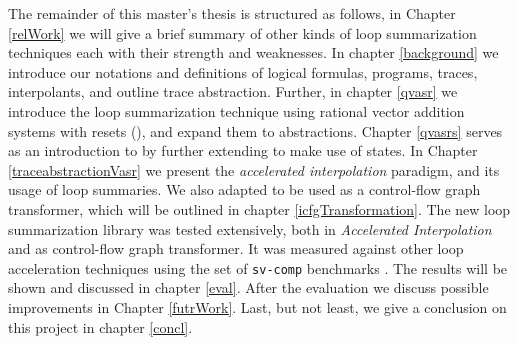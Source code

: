 The remainder of this master's thesis is structured as follows, in Chapter \ref{relWork} we will give a brief summary of other kinds of loop summarization techniques each with their strength and weaknesses. In chapter \ref{background} we introduce our notations and definitions of logical formulas, programs, traces, interpolants, and outline trace abstraction. Further, in chapter \ref{qvasr} we introduce the loop summarization technique using rational vector addition systems with resets (\qvasr), and expand them to \qvasr abstractions. Chapter \ref{qvasrs} serves as an introduction to \qvasrs by further extending \qvasr to make use of states. In Chapter \ref{traceabstractionVasr} we present the \textsl{accelerated interpolation} paradigm, and its usage of \qvasr loop summaries. We also adapted \qvasr to be used as a control-flow graph transformer, which will be outlined in chapter \ref{icfgTransformation}. The new loop summarization library was tested extensively, both in \textsl{Accelerated Interpolation} and as control-flow graph transformer. It was measured against other loop acceleration techniques using the set of \texttt{sv-comp} benchmarks \cite{svcomp}. The results will be shown and discussed in chapter \ref{eval}. After the evaluation we discuss possible improvements in Chapter \ref{futrWork}. Last, but not least, we give a conclusion on this project in chapter \ref{concl}.

